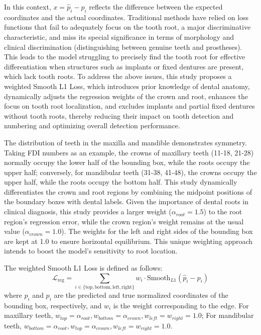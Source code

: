 \documentclass[pdflatex,sn-mathphys-num]{sn-jnl}%
\theoremstyle{thmstyleone}%
\theoremstyle{thmstyletwo}%
\theoremstyle{thmstylethree}%
\begin{document}
In this context, $x = \hat{p}_i - p_i$ reflects the difference between the expected coordinates and the actual coordinates. Traditional methods have relied on loss functions that fail to adequately focus on the tooth root, a major discriminative characteristic, and miss its special significance in terms of morphology and clinical discrimination (distinguishing between genuine teeth and prostheses). This leads to the model struggling to precisely find the tooth root for effective differentiation when structures such as implants or fixed dentures are present, which lack tooth roots. To address the above issues, this study proposes a weighted Smooth L1 Loss, which introduces prior knowledge of dental anatomy, dynamically adjusts the regression weights of the crown and root, enhances the focus on tooth root localization, and excludes implants and partial fixed dentures without tooth roots, thereby reducing their impact on tooth detection and numbering and optimizing overall detection performance.

The distribution of teeth in the maxilla and mandible demonstrates symmetry.  Taking FDI numbers as an example, the crowns of maxillary teeth (11-18, 21-28) normally occupy the lower half of the bounding box, while the roots occupy the upper half; conversely, for mandibular teeth (31-38, 41-48), the crowns occupy the upper half, while the roots occupy the bottom half.  This study dynamically differentiates the crown and root regions by combining the midpoint positions of the boundary boxes with dental labels.
Given the importance of dental roots in clinical diagnosis, this study provides a larger weight ($\alpha_{root}=1.5$) to the root region's regression error, while the crown region's weight remains at the usual value ($\alpha_{crown}=1.0$).  The weights for the left and right sides of the bounding box are kept at 1.0 to ensure horizontal equilibrium.  This unique weighting approach intends to boost the model's sensitivity to root location.

The weighted Smooth L1 Loss is defined as follows:
\[
\mathcal{L}_{\text{reg}} = \sum_{i \in \{\text{top}, \text{bottom}, \text{left}, \text{right}\}} w_i \cdot \text{Smooth}_{L1}(\hat{p}_i - p_i)
\]
where $\hat{p}_i$ and $p_i$ are the predicted and true normalized coordinates of the bounding box, respectively, and $w_i$ is the weight corresponding to the edge. For maxillary teeth, $w_{top}=\alpha_{root},w_{bottom}=\alpha_{crown},w_{left}=w_{right}=1.0$; For mandibular teeth,
$w_{bottom}=\alpha_{root},w_{top}=\alpha_{crown},w_{left}=w_{right}=1.0$.
\end{document}
